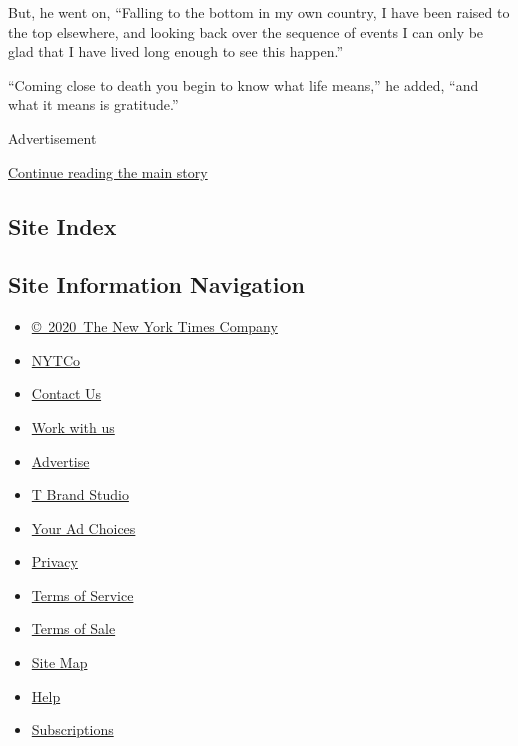 But, he went on, ``Falling to the bottom in my own country, I have been
raised to the top elsewhere, and looking back over the sequence of
events I can only be glad that I have lived long enough to see this
happen.''

``Coming close to death you begin to know what life means,'' he added,
``and what it means is gratitude.''

Advertisement

\protect\hyperlink{after-bottom}{Continue reading the main story}

\hypertarget{site-index}{%
\subsection{Site Index}\label{site-index}}

\hypertarget{site-information-navigation}{%
\subsection{Site Information
Navigation}\label{site-information-navigation}}

\begin{itemize}
\tightlist
\item
  \href{https://help.nytimes.com/hc/en-us/articles/115014792127-Copyright-notice}{©~2020~The
  New York Times Company}
\end{itemize}

\begin{itemize}
\tightlist
\item
  \href{https://www.nytco.com/}{NYTCo}
\item
  \href{https://help.nytimes.com/hc/en-us/articles/115015385887-Contact-Us}{Contact
  Us}
\item
  \href{https://www.nytco.com/careers/}{Work with us}
\item
  \href{https://nytmediakit.com/}{Advertise}
\item
  \href{http://www.tbrandstudio.com/}{T Brand Studio}
\item
  \href{https://www.nytimes.com/privacy/cookie-policy\#how-do-i-manage-trackers}{Your
  Ad Choices}
\item
  \href{https://www.nytimes.com/privacy}{Privacy}
\item
  \href{https://help.nytimes.com/hc/en-us/articles/115014893428-Terms-of-service}{Terms
  of Service}
\item
  \href{https://help.nytimes.com/hc/en-us/articles/115014893968-Terms-of-sale}{Terms
  of Sale}
\item
  \href{https://spiderbites.nytimes.com}{Site Map}
\item
  \href{https://help.nytimes.com/hc/en-us}{Help}
\item
  \href{https://www.nytimes.com/subscription?campaignId=37WXW}{Subscriptions}
\end{itemize}
